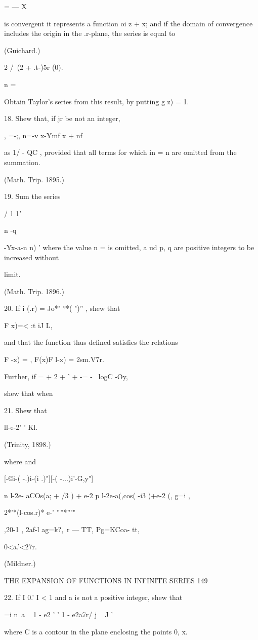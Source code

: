 {{  = — X

is convergent it represents a function oi z + x; and if the domain of
convergence includes the origin in the .r-plane, the series is equal
to

(Guichard.)

2 /\ (2 + .t-)5r (0).

n =

Obtain Taylor's series from this result, by putting g z) = 1.

18. Shew that, if jr be not an integer,

, =-;, n=-v x-¥mf x + nf

as 1/ - QC , provided that all terms for which in = n are omitted from
the summation.

(Math. Trip. 1895.)

19. Sum the series

  / 1 1'

n -q \ \ {-Yx-a-n n) ' where the value n = is omitted, a ud p, q are
positive integers to be increased without

limit.

(Math. Trip. 1896.)

20. If i (.r) = Jo*" °*( ")'' , shew that

F x)=< :t iJ L,

and that the function thus defined satisfies the relations

F -x) = , F(x)F l-x) = 2sm.V7r.

Further, if = + 2 + ' + -= - \ logC -Oy,

shew that when

21. Shew that

ll-e-2' ' Kl.

(Trinity, 1898.)

where and

[-©i-( -.)i-(i .)"][-( -...)i'-G,y"]

n l-2e- aCOs(a; + /3 ) + e-2 p l-2e-a(,cos( -i3 )+e-2 (, g=i ,

2*'*(l-cos.r)* e-' ''''*'''"

,20-1 , 2af-l ag=k?,\ r — TT, Pg=KCoa- tt,

0<a.'<27r.

(Mildner.)

THE EXPANSION OF FUNCTIONS IN INFINITE SERIES 149

22. If I 0.' I < 1 and a is not a positive integer, shew that

 =i n~a ~ 1 - e2 ' ' 1 - e2a7r/ j ~ J '

where C is a contour in the plane enclosing the points 0, x.

}}}
